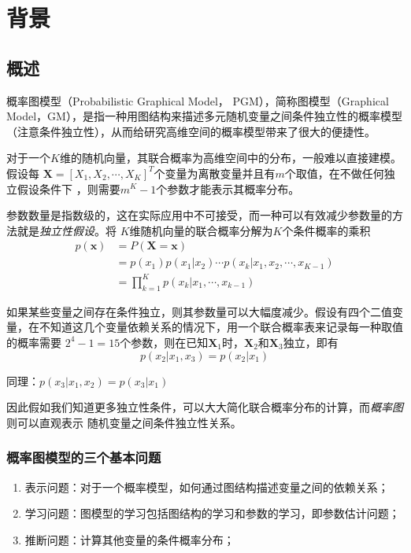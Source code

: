 \chapter{背景}

\section{概述}
概率图模型（Probabilistic Graphical Model， PGM），简称图模型（Graphical Model，GM），是指一种用图结构来描述多元随机变量之间条件独立性的概率模型（注意条件独立性），从而给研究高维空间的概率模型带来了很大的便捷性。

对于一个$K$维的随机向量，其联合概率为高维空间中的分布，一般难以直接建模。假设每
$\mathbf{X}=[X_1,X_2,\cdots,X_K]^T$个变量为离散变量并且有$m$个取值，在不做任何独立假设条件下
，则需要$m^K-1$个参数才能表示其概率分布。

参数数量是指数级的，这在实际应用中不可接受，而一种可以有效减少参数量的方法就是\textsl{独立性假设}。将
$K$维随机向量的联合概率分解为$K$个条件概率的乘积
\begin{equation}
    \begin{aligned}
         p(\mathbf{x}) &=P(\mathbf{X}=\mathbf{x})\\
         & = p(x_1)p(x_1|x_2)\cdots p(x_k|x_1,x_2,\cdots,x_{K-1})\\
         & = \prod\limits_{k=1}^{K}p(x_k|x_1,\cdots,x_{k-1})
    \end{aligned}
\end{equation}

如果某些变量之间存在条件独立，则其参数量可以大幅度减少。假设有四个二值变量，在不知道这几个变量依赖关系的情况下，用一个联合概率表来记录每一种取值的概率需要
$2^4-1=15$个参数，则在已知$\mathbf{X}_1$时，$\mathbf{X}_2$和$\mathbf{X}_3$独立，即有
\begin{equation}
    p(x_2|x_1,x_3)=p(x_2|x_1)
\end{equation}

同理：$p(x_3|x_1,x_2)=p(x_3|x_1)$

因此假如我们知道更多独立性条件，可以大大简化联合概率分布的计算，而\textsl{概率图}则可以直观表示
随机变量之间条件独立性关系。

\subsection*{概率图模型的三个基本问题}

\begin{enumerate}
    \item 表示问题：对于一个概率模型，如何通过图结构描述变量之间的依赖关系；
    \item 学习问题：图模型的学习包括图结构的学习和参数的学习，即参数估计问题；
    \item 推断问题：计算其他变量的条件概率分布；
\end{enumerate}

